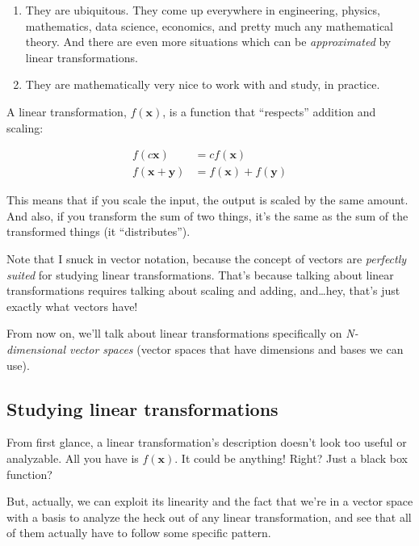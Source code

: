 \documentclass[]{article}
\begin{document}
\begin{enumerate}
\def\labelenumi{\arabic{enumi}.}
\tightlist
\item
  They are ubiquitous. They come up everywhere in engineering, physics,
  mathematics, data science, economics, and pretty much any mathematical theory.
  And there are even more situations which can be \emph{approximated} by linear
  transformations.
\item
  They are mathematically very nice to work with and study, in practice.
\end{enumerate}

A linear transformation, \(f(\mathbf{x})\), is a function that ``respects''
addition and scaling:

\[
\begin{aligned}
f(c\mathbf{x}) & = c f(\mathbf{x}) \\
f(\mathbf{x} + \mathbf{y}) & = f(\mathbf{x}) + f(\mathbf{y})
\end{aligned}
\]

This means that if you scale the input, the output is scaled by the same amount.
And also, if you transform the sum of two things, it's the same as the sum of
the transformed things (it ``distributes'').

Note that I snuck in vector notation, because the concept of vectors are
\emph{perfectly suited} for studying linear transformations. That's because
talking about linear transformations requires talking about scaling and adding,
and\ldots hey, that's just exactly what vectors have!

From now on, we'll talk about linear transformations specifically on
\emph{N-dimensional vector spaces} (vector spaces that have dimensions and bases
we can use).

\subsection{Studying linear
transformations}\label{studying-linear-transformations}

From first glance, a linear transformation's description doesn't look too useful
or analyzable. All you have is \(f(\mathbf{x})\). It could be anything! Right?
Just a black box function?

But, actually, we can exploit its linearity and the fact that we're in a vector
space with a basis to analyze the heck out of any linear transformation, and see
that all of them actually have to follow some specific pattern.
\end{document}
